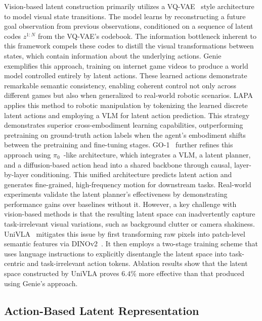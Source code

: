 \documentclass[10pt, a4paper, logo, copyright]{googledeepmind} %
\begin{document}
Vision-based latent construction primarily utilizes a VQ-VAE~\cite{van2017neural} style architecture to model visual state transitions. The model learns by reconstructing a future goal observation from previous observations, conditioned on a sequence of latent codes $z ^ {1:N}$ from the VQ-VAE's codebook. The information bottleneck inherent to this framework compels these codes to distill the visual transformations between states, which contain information about the underlying actions. 
Genie~\cite{bruce2024genie} exemplifies this approach, training on internet game videos to produce a world model controlled entirely by latent actions. These learned actions demonstrate remarkable semantic consistency, enabling coherent control not only across different games but also when generalized to real-world robotic scenarios.
LAPA~\cite{ye2024latent} applies this method to robotic manipulation by tokenizing the learned discrete latent actions and employing a VLM for latent action prediction. This strategy demonstrates superior cross-embodiment learning capabilities, outperforming pretraining on ground-truth action labels when the agent's embodiment shifts between the pretraining and fine-tuning stages.
GO-1~\cite{bu2025agibot} further refines this approach using $\pi_0$~\cite{black2410pi0}-like architecture, which integrates a VLM, a latent planner, and a diffusion-based action head into a shared backbone through causal, layer-by-layer conditioning. This unified architecture predicts latent action and generates fine-grained, high-frequency motion for downstream tasks. Real-world experiments validate the latent planner's effectiveness by demonstrating performance gains over baselines without it.
However, a key challenge with vision-based methods is that the resulting latent space can inadvertently capture task-irrelevant visual variations, such as background clutter or camera shakiness. UniVLA~\cite{bu2025univla} mitigates this issue by first transforming raw pixels into patch-level semantic features via DINOv2~\cite{oquab2023dinov2}. It then employs a two-stage training scheme that uses language instructions to explicitly disentangle the latent space into task-centric and task-irrelevant action tokens. Ablation results show that the latent space constructed by UniVLA proves $6.4\%$ more effective than that produced using Genie's approach.


\subsection{Action-Based Latent Representation}
\end{document}
